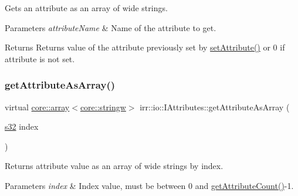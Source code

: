 Gets an attribute as an array of wide strings. 


\begin{DoxyParams}{Parameters}
{\em attribute\+Name} & Name of the attribute to get. \\
\hline
\end{DoxyParams}
\begin{DoxyReturn}{Returns}
Returns value of the attribute previously set by \hyperlink{classirr_1_1io_1_1IAttributes_a03fa31acb481ae23678676cc183f09a6}{set\+Attribute()} or 0 if attribute is not set. 
\end{DoxyReturn}
\mbox{\label{classirr_1_1io_1_1IAttributes_a78e6562bd6e45c24d10c8cf77e3b317a}} 
\subsubsection{\texorpdfstring{get\+Attribute\+As\+Array()}{getAttributeAsArray()}\hspace{0.1cm}{\footnotesize\ttfamily [3/4]}}
{\footnotesize\ttfamily virtual \hyperlink{classirr_1_1core_1_1array}{core\+::array}$<$\hyperlink{namespaceirr_1_1core_a5aedb62cb47cf01d1c548ab5e6344d2d}{core\+::stringw}$>$ irr\+::io\+::\+I\+Attributes\+::get\+Attribute\+As\+Array (\begin{DoxyParamCaption}\item[{\hyperlink{namespaceirr_ac66849b7a6ed16e30ebede579f9b47c6}{s32}}]{index }\end{DoxyParamCaption})\hspace{0.3cm}{\ttfamily [pure virtual]}}



Returns attribute value as an array of wide strings by index. 


\begin{DoxyParams}{Parameters}
{\em index} & Index value, must be between 0 and \hyperlink{classirr_1_1io_1_1IAttributes_a796bdd9440ee7ba0b6742a90a82870b6}{get\+Attribute\+Count()}-\/1. \\
\hline
\end{DoxyParams}
\mbox{\label{classirr_1_1io_1_1IAttributes_a78e6562bd6e45c24d10c8cf77e3b317a}} 
